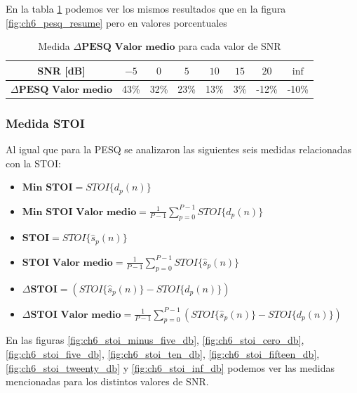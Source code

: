 En la tabla \ref{table:pesq_resume} podemos ver los mismos resultados que en la figura \ref{fig:ch6_pesq_resume} pero en valores porcentuales

\begin{table}[ht]
	\centering
	\begin{tabular}{ |c|c|c|c|c|c|c|c| } 
		\hline
		SNR [dB] & $-5$ & $0$ & $5$ & $10$ & $15$ & $20$ & $\inf$ \\ 
		\hline
		$\Delta \textbf{PESQ Valor medio}$ & 43\%  & 32\% & 23\% & 13\% & 3\% & -12\% & -10\% \\ 
		\hline
	\end{tabular}
	\caption{Medida $\Delta \textbf{PESQ Valor medio}$ para cada valor de SNR}
	\label{table:pesq_resume}
\end{table}

\subsubsection{Medida STOI}

Al igual que para la PESQ se analizaron las siguientes seis medidas relacionadas con la STOI:

\begin{itemize}
	\item $\textbf{Min STOI} = STOI\{ d_p(n) \}$
	\item $\textbf{Min STOI Valor medio} = \frac{1}{P-1} \sum_{p=0}^{P-1} STOI\{ d_p(n) \}$
	\item $\textbf{STOI} = STOI\{ \hat{s}_p(n) \}$
	\item $\textbf{STOI Valor medio} = \frac{1}{P-1} \sum_{p=0}^{P-1} STOI\{ \hat{s}_p(n) \}$
	\item $\Delta \textbf{STOI} = \left( STOI\{ \hat{s}_p(n) \} - STOI\{ d_p(n) \} \right)$
	\item $\Delta \textbf{STOI Valor medio} = \frac{1}{P-1} \sum_{p=0}^{P-1} \left( STOI\{ \hat{s}_p(n) \} - STOI\{ d_p(n) \} \right)$
\end{itemize}

En las figuras \ref{fig:ch6_stoi_minus_five_db}, \ref{fig:ch6_stoi_cero_db}, \ref{fig:ch6_stoi_five_db}, \ref{fig:ch6_stoi_ten_db}, \ref{fig:ch6_stoi_fifteen_db},
\ref{fig:ch6_stoi_tweenty_db} y \ref{fig:ch6_stoi_inf_db} podemos ver las medidas mencionadas para los distintos valores de SNR.

